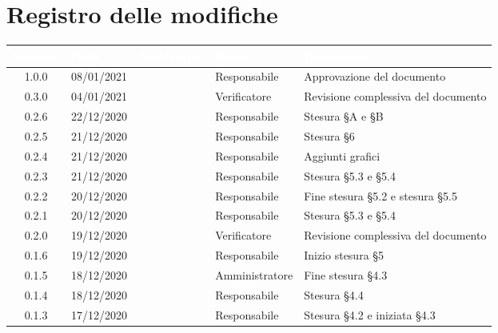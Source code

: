 \section*{Registro delle modifiche}
{
\renewcommand{\arraystretch}{1.5}
\centering
\begin{longtable}{c C{2.6cm} C{3cm} C{3cm} C{5cm}}
\textcolor{white}{\textbf{Versione}}&
\textcolor{white}{\textbf{Data}}&
\textcolor{white}{\textbf{Nominativo}}&
\textcolor{white}{\textbf{Ruolo}}&
\textcolor{white}{\textbf{Descrizione}}\\	
\endhead

1.0.0 & 08/01/2021 & \SG{} & Responsabile & Approvazione del documento \\

0.3.0 & 04/01/2021 & \SH{} & Verificatore & Revisione complessiva del documento \\

0.2.6 & 22/12/2020 & \BM{} & Responsabile & Stesura \S A e \S B \\

0.2.5 & 21/12/2020 & \BM{} & Responsabile & Stesura \S 6\\

0.2.4 & 21/12/2020 & \SG{} & Responsabile & Aggiunti grafici \\

0.2.3 & 21/12/2020 & \BM{} & Responsabile & Stesura \S 5.3 e \S 5.4\\

0.2.2 & 20/12/2020 & \SG{} & Responsabile & Fine stesura \S 5.2 e stesura \S 5.5 \\

0.2.1 & 20/12/2020 & \BM{} & Responsabile & Stesura \S 5.3 e \S 5.4\\

0.2.0 & 19/12/2020 & \ZM{} & Verificatore & Revisione complessiva del documento \\

0.1.6 & 19/12/2020 & \SG{} & Responsabile & Inizio stesura \S 5 \\

0.1.5 & 18/12/2020 & \PA{} & Amministratore & Fine stesura \S 4.3\\

0.1.4 & 18/12/2020 & \SG{} & Responsabile & Stesura \S 4.4 \\

0.1.3 & 17/12/2020 & \BM{} & Responsabile & Stesura \S 4.2 e iniziata \S 4.3 \\


\end{longtable}}
